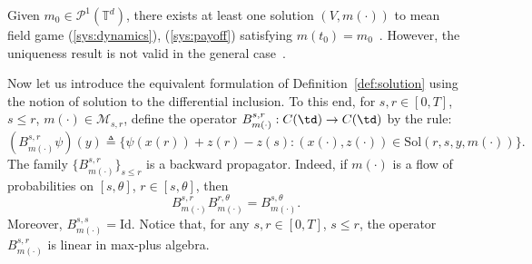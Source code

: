 \documentclass[a4paper,12pt]{article}
\newcommand{\ptd}{\mathcal{P}^1(\mathbb{T}^d)}
\begin{document}
Given $m_0\in\ptd$, there exists at least one solution $(V,m(\cdot))$ to mean field game (\ref{sys:dynamics}), (\ref{sys:payoff}) satisfying $m(t_0)=m_0$~\cite{Averboukh_2015}. However, the uniqueness result is not valid in the general case~\cite{Bardi_Fischer_2017}.

Now let us introduce the equivalent formulation of Definition~\ref{def:solution} using the notion of solution to the differential inclusion. To this end, for $s,r\in [0,T]$, $s\leq r$, $m(\cdot)\in\mathcal{M}_{s,r}$, define the operator $B^{s,r}_{m(\cdot)}:C(\td)\rightarrow C(\td)$ by the rule:
\begin{equation}\label{intro:Bellman}
(B^{s,r}_{m(\cdot)}\psi)(y)\triangleq\{\psi(x(r))+z(r)-z(s):(x(\cdot),z(\cdot))\in\mathrm{Sol}(r,s,y,m(\cdot))\}. 
\end{equation}
The family $\{B_{m(\cdot)}^{s,r}\}_{s\leq r}$ is a backward propagator. Indeed,  if $ m(\cdot)$ is a flow of probabilities on $[s,\theta]$, $r\in [s,\theta]$, then  
\begin{equation}\label{equality:B_semogroup}
B^{s,r}_{m(\cdot)} B^{r,\theta}_{m(\cdot)}=B_{m(\cdot)}^{s,\theta}. 
\end{equation} Moreover, $B_{m(\cdot)}^{s,s}=\mathrm{Id}$. Notice that, for any $s,r\in [0,T]$, $s\leq r$, the operator $B^{s,r}_{m(\cdot)}$ is linear in max-plus algebra.
\end{document}
